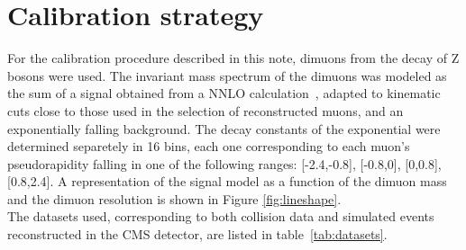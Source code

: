 \section{Calibration strategy}
\label{sec:calibration}
For the calibration procedure described in this note, dimuons from the decay of
Z bosons were used. 
The invariant mass spectrum of the dimuons 
was modeled as the sum of a signal obtained from a NNLO
calculation~\cite{Dittmaier:2009cr}, adapted to kinematic cuts close to
those used in the selection of reconstructed muons, and an
exponentially falling background. The decay constants of the
exponential were determined separetely in 16 bins, each one corresponding to each 
muon's pseudorapidity falling in one of the following ranges: [-2.4,-0.8], [-0.8,0], 
[0,0.8], [0.8,2.4]. A representation of the signal model as a function of the dimuon mass 
and the dimuon resolution is shown in Figure \ref{fig:lineshape}.\\
The datasets used, corresponding to both collision data and simulated events reconstructed in the CMS 
detector, are listed in table~\ref{tab:datasets}.
